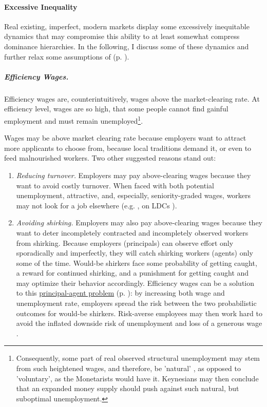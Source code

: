 \paragraph{Excessive Inequality} \label{sec:inequality_dynamics} Real existing, imperfect, modern markets display some excessively inequitable dynamics that may compromise this ability to at least somewhat compress dominance hierarchies. In the following, I discuss some of these dynamics and further relax some assumptions of   (p. \pageref{sec:perfect_competition}). %

\subparagraph[Efficiency Wages]{Efficiency Wages.}  \label{sec:efficiency_wages} Efficiency wages are, counterintuitively, wages above the market-clearing rate. At efficiency level, wages are so high, that some people cannot find gainful employment and must remain unemployed\footnote{
	Consequently, some part of real observed structural unemployment may stem from such heightened wages, and therefore, be 'natural' \citep{Schlicht1978}, as opposed to 'voluntary', as the Monetarists would have it. Keynesians may then conclude that an expanded money supply should push against such natural, but suboptimal unemployment.}.

Wages may be above market clearing rate because employers want to attract more applicants to choose from, because local traditions demand it, or even to feed malnourished workers. Two other suggested reasons stand out: 

\begin{enumerate}
	\item \emph{Reducing turnover.} Employers may pay above-clearing wages because they want to avoid costly turnover. When faced with both potential unemployment, attractive, and, especially, seniority-graded wages, workers may not look for a job elsewhere (e.g. \citealt{Salop1979}, on \glspl{LDC} \citealt{Stiglitz1974a}).
	\item \emph{Avoiding shirking.} Employers may also pay above-clearing wages because they want to deter incompletely contracted and incompletely observed workers from shirking. Because employers (principals) can observe effort only sporadically and imperfectly, they will catch shirking workers (agents) only some of the time. Would-be shirkers face some probability of getting caught, a reward for continued shirking, and a punishment for getting caught and may optimize their behavior accordingly. Efficiency wages can be a solution to this \hyperref[sec:principal-agent_problem]{principal-agent problem} (p. \pageref{sec:principal-agent_problem}): by increasing both wage and unemployment rate, employers spread the risk between the two probabilistic outcomes for would-be shirkers. Risk-averse employees may then work hard to avoid the inflated downside risk of unemployment and loss of a generous wage \citep{Stiglitz1984}.
\end{enumerate}


